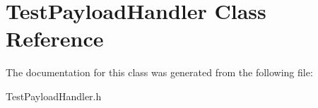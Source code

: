 \hypertarget{interface_test_payload_handler}{
\section{\-Test\-Payload\-Handler \-Class \-Reference}
\label{interface_test_payload_handler}
}


\-The documentation for this class was generated from the following file\-:\begin{DoxyCompactItemize}
\item 
\-Test\-Payload\-Handler.\-h\end{DoxyCompactItemize}
